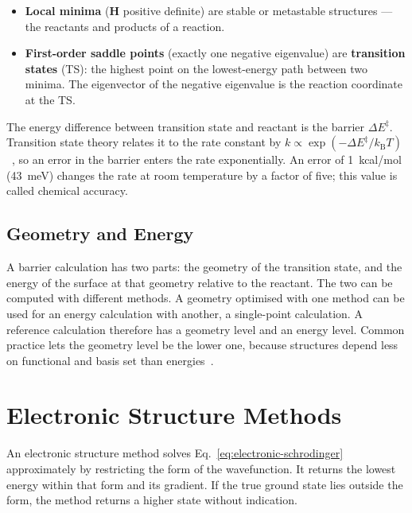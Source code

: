 \begin{itemize}
  \item \textbf{Local minima} ($\mathbf{H}$ positive definite) are stable or
    metastable structures --- the reactants and products of a reaction.
  \item \textbf{First-order saddle points} (exactly one negative eigenvalue)
    are \textbf{transition states} (TS): the highest point on the
    lowest-energy path between two minima. The eigenvector of the negative
    eigenvalue is the reaction coordinate at the TS.
\end{itemize}

The energy difference between transition state and reactant is the barrier
$\Delta E^\ddagger$. Transition state theory relates it to the rate constant
by $k \propto \exp(-\Delta E^\ddagger / k_\text{B} T)$~\cite{eyring1935}, so
an error in the barrier enters the rate exponentially. An error of
1~kcal/mol (43~meV) changes the rate at room temperature by a factor of
five; this value is called chemical accuracy.

\subsection{Geometry and Energy}
\label{sec:geom-energy}

A barrier calculation has two parts: the geometry of the transition state,
and the energy of the surface at that geometry relative to the reactant. The
two can be computed with different methods. A geometry optimised with one
method can be used for an energy calculation with another, a single-point
calculation. A reference calculation therefore has a geometry level and an
energy level. Common practice lets the geometry level be the lower one,
because structures depend less on functional and basis set than
energies~\cite{bursch2022}.

\section{Electronic Structure Methods}
\label{sec:background-electronic}

An electronic structure method solves Eq.~\eqref{eq:electronic-schrodinger}
approximately by restricting the form of the wavefunction. It returns the
lowest energy within that form and its gradient. If the true ground state
lies outside the form, the method returns a higher state without indication.

